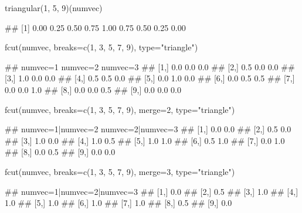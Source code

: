 \documentclass{article}\usepackage[]{graphicx}\usepackage[]{color}
\begin{document}
\begin{Schunk}
% --begin: "fcut.triangular"
\begin{Sinput}
triangular(1, 5, 9)(numvec)
\end{Sinput}
\begin{Soutput}
## [1] 0.00 0.25 0.50 0.75 1.00 0.75 0.50 0.25 0.00
\end{Soutput}
%
% --end: "fcut.triangular"
\end{Schunk}

\begin{Schunk}
% --begin: "fcut.numeric2"
\begin{Sinput}
fcut(numvec,
     breaks=c(1, 3, 5, 7, 9),
     type="triangle")
\end{Sinput}
\begin{Soutput}
##       numvec=1 numvec=2 numvec=3
##  [1,]      0.0      0.0      0.0
##  [2,]      0.5      0.0      0.0
##  [3,]      1.0      0.0      0.0
##  [4,]      0.5      0.5      0.0
##  [5,]      0.0      1.0      0.0
##  [6,]      0.0      0.5      0.5
##  [7,]      0.0      0.0      1.0
##  [8,]      0.0      0.0      0.5
##  [9,]      0.0      0.0      0.0
\end{Soutput}
%
% --end: "fcut.numeric2"
\end{Schunk}

\begin{Schunk}
% --begin: "fcut.merge"
\begin{Sinput}
fcut(numvec,
     breaks=c(1, 3, 5, 7, 9),
     merge=2,
     type="triangle")
\end{Sinput}
\begin{Soutput}
##       numvec=1|numvec=2 numvec=2|numvec=3
##  [1,]               0.0               0.0
##  [2,]               0.5               0.0
##  [3,]               1.0               0.0
##  [4,]               1.0               0.5
##  [5,]               1.0               1.0
##  [6,]               0.5               1.0
##  [7,]               0.0               1.0
##  [8,]               0.0               0.5
##  [9,]               0.0               0.0
\end{Soutput}
\begin{Sinput}
fcut(numvec,
     breaks=c(1, 3, 5, 7, 9),
     merge=3,
     type="triangle")
\end{Sinput}
\begin{Soutput}
##       numvec=1|numvec=2|numvec=3
##  [1,]                        0.0
##  [2,]                        0.5
##  [3,]                        1.0
##  [4,]                        1.0
##  [5,]                        1.0
##  [6,]                        1.0
##  [7,]                        1.0
##  [8,]                        0.5
##  [9,]                        0.0
\end{Soutput}
%
% --end: "fcut.merge"
\end{Schunk}
\end{document}

